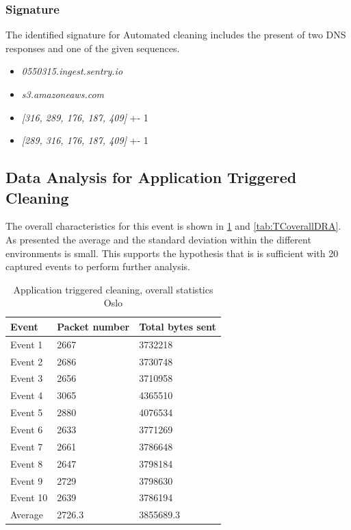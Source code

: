 \subsubsection{Signature}
The identified signature for Automated cleaning includes the present of two DNS responses and one of the given sequences.  

\begin{itemize}
    \item \textit{0550315.ingest.sentry.io}
    \item \textit{s3.amazoneaws.com}
    \item \textit{[316, 289, 176, 187, 409]} +- 1
    \item \textit{[289, 316, 176, 187, 409]} +- 1
\end{itemize}


\subsection{Data Analysis for Application Triggered Cleaning}
The overall characteristics for this event is shown in \ref{tab:TCoverallOSL} and \ref{tab:TCoverallDRA}. As presented the average and the standard deviation within the different environments is small. This supports the hypothesis that is is sufficient with 20 captured events to perform further analysis.

\begin{table}[H]
\centering
\caption{Application triggered cleaning, overall statistics Oslo}
\label{tab:TCoverallOSL}
\begin{tabular}{|l|l|l|}
\hline
\textbf{Event} & \textbf{Packet number} & \textbf{Total bytes sent} \\ \hline
Event 1        & 2667                   & 3732218                   \\ \hline
Event 2        & 2686                   & 3730748                   \\ \hline
Event 3        & 2656                   & 3710958                   \\ \hline
Event 4        & 3065                   & 4365510                   \\ \hline
Event 5        & 2880                   & 4076534                   \\ \hline
Event 6        & 2633                   & 3771269                   \\ \hline
Event 7        & 2661                   & 3786648                   \\ \hline
Event 8        & 2647                   & 3798184                   \\ \hline
Event 9        & 2729                   & 3798630                   \\ \hline
Event 10       & 2639                   & 3786194                   \\ \hline
Average        & 2726.3                 & 3855689.3                 \\ \hline
\end{tabular}
\end{table}

